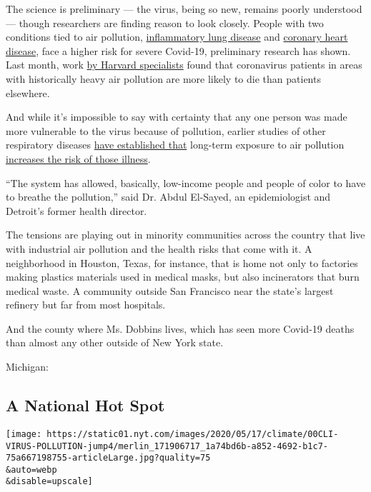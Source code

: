 The science is preliminary --- the virus, being so new, remains poorly
understood --- though researchers are finding reason to look closely.
People with two conditions tied to air pollution,
\href{https://www.resmedjournal.com/article/S0954-6111(20)30081-0/fulltext}{inflammatory
lung disease} and
\href{https://www.medrxiv.org/content/10.1101/2020.03.25.20043133v1}{coronary
heart disease}, face a higher risk for severe Covid-19, preliminary
research has shown. Last month, work
\href{https://www.nytimes.com/2020/04/07/climate/air-pollution-coronavirus-covid.html}{by
Harvard specialists} found that coronavirus patients in areas with
historically heavy air pollution are more likely to die than patients
elsewhere.

And while it's impossible to say with certainty that any one person was
made more vulnerable to the virus because of pollution, earlier studies
of other respiratory diseases
\href{https://www.ncbi.nlm.nih.gov/pubmed/14629774}{have established
that} long-term exposure to air pollution
\href{https://www.ncbi.nlm.nih.gov/pubmed/28966029}{increases the risk
of those illness}.

``The system has allowed, basically, low-income people and people of
color to have to breathe the pollution,'' said Dr. Abdul El-Sayed, an
epidemiologist and Detroit's former health director.

The tensions are playing out in minority communities across the country
that live with industrial air pollution and the health risks that come
with it. A neighborhood in Houston, Texas, for instance, that is home
not only to factories making plastics materials used in medical masks,
but also incinerators that burn medical waste. A community outside San
Francisco near the state's largest refinery but far from most hospitals.

And the county where Ms. Dobbins lives, which has seen more Covid-19
deaths than almost any other outside of New York state.

Michigan:

\hypertarget{a-national-hot-spot}{%
\subsection{A National Hot Spot}\label{a-national-hot-spot}}

\texttt{[image: https://static01.nyt.com/images/2020/05/17/climate/00CLI-VIRUS-POLLUTION-jump4/merlin\_171906717\_1a74bd6b-a852-4692-b1c7-75a667198755-articleLarge.jpg?quality=75\\\&auto=webp\\\&disable=upscale]}

